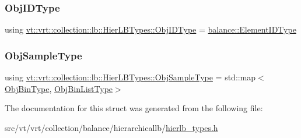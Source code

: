 \subsubsection{\texorpdfstring{Obj\+I\+D\+Type}{ObjIDType}}
{\footnotesize\ttfamily using \hyperlink{structvt_1_1vrt_1_1collection_1_1lb_1_1_hier_l_b_types_a52254678ca07c280dba927d688a0202f}{vt\+::vrt\+::collection\+::lb\+::\+Hier\+L\+B\+Types\+::\+Obj\+I\+D\+Type} =  \hyperlink{namespacevt_1_1vrt_1_1collection_1_1balance_a14c8d2c972f2913aa3f1636e5be0a120}{balance\+::\+Element\+I\+D\+Type}}

\mbox{\label{structvt_1_1vrt_1_1collection_1_1lb_1_1_hier_l_b_types_a597a60d517207b90e8c7984eac434e8f}} 
\subsubsection{\texorpdfstring{Obj\+Sample\+Type}{ObjSampleType}}
{\footnotesize\ttfamily using \hyperlink{structvt_1_1vrt_1_1collection_1_1lb_1_1_hier_l_b_types_a597a60d517207b90e8c7984eac434e8f}{vt\+::vrt\+::collection\+::lb\+::\+Hier\+L\+B\+Types\+::\+Obj\+Sample\+Type} =  std\+::map$<$\hyperlink{structvt_1_1vrt_1_1collection_1_1lb_1_1_hier_l_b_types_a280971a7971a7fc215214e81ba3b12b5}{Obj\+Bin\+Type}, \hyperlink{structvt_1_1vrt_1_1collection_1_1lb_1_1_hier_l_b_types_ac1e6fedb923b2a16f440a61e6dc94173}{Obj\+Bin\+List\+Type}$>$}



The documentation for this struct was generated from the following file\+:\begin{DoxyCompactItemize}
\item 
src/vt/vrt/collection/balance/hierarchicallb/\hyperlink{hierlb__types_8h}{hierlb\+\_\+types.\+h}\end{DoxyCompactItemize}
